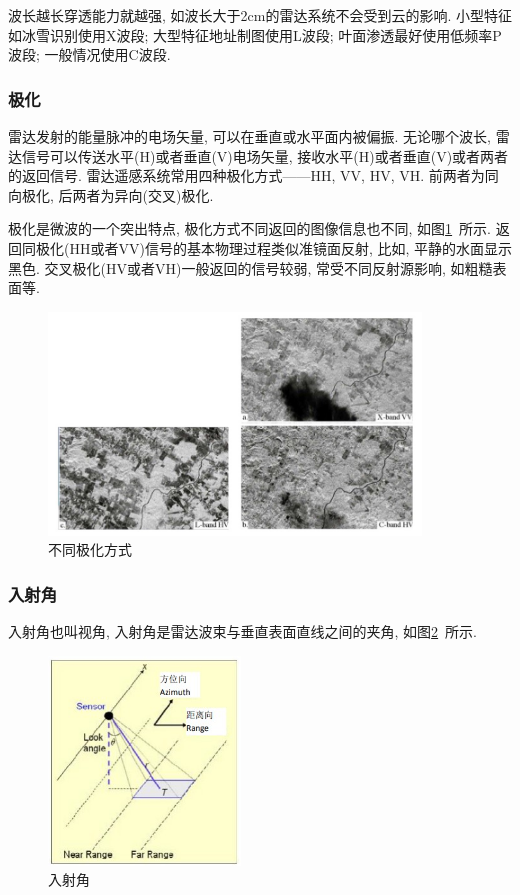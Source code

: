 波长越长穿透能力就越强, 如波长大于2cm的雷达系统不会受到云的影响. 小型特征如冰雪识别使用X波段; 大型特征地址制图使用L波段; 叶面渗透最好使用低频率P波段; 一般情况使用C波段. 

\subsubsection{极化}
雷达发射的能量脉冲的电场矢量, 可以在垂直或水平面内被偏振. 无论哪个波长, 雷达信号可以传送水平(H)或者垂直(V)电场矢量, 接收水平(H)或者垂直(V)或者两者的返回信号. 雷达遥感系统常用四种极化方式——HH, VV, HV, VH. 前两者为同向极化, 后两者为异向(交叉)极化.

极化是微波的一个突出特点, 极化方式不同返回的图像信息也不同, 如图\ref{fig:0102}~所示. 返回同极化(HH或者VV)信号的基本物理过程类似准镜面反射, 比如, 平静的水面显示黑色. 交叉极化(HV或者VH)一般返回的信号较弱, 常受不同反射源影响, 如粗糙表面等.

\begin{figure}[htbp]
    \centering
    \includegraphics[height=16em]{pic/chap01xx02.jpg}
    \caption{不同极化方式}
    \label{fig:0102}
\end{figure}

\subsubsection{入射角}
入射角也叫视角, 入射角是雷达波束与垂直表面直线之间的夹角, 如图\ref{fig:0103}~所示.

\begin{figure}[htbp]
    \centering
    \includegraphics[height=15em]{pic/chap01xx.jpg}
    \caption{入射角}
    \label{fig:0103}
\end{figure}

